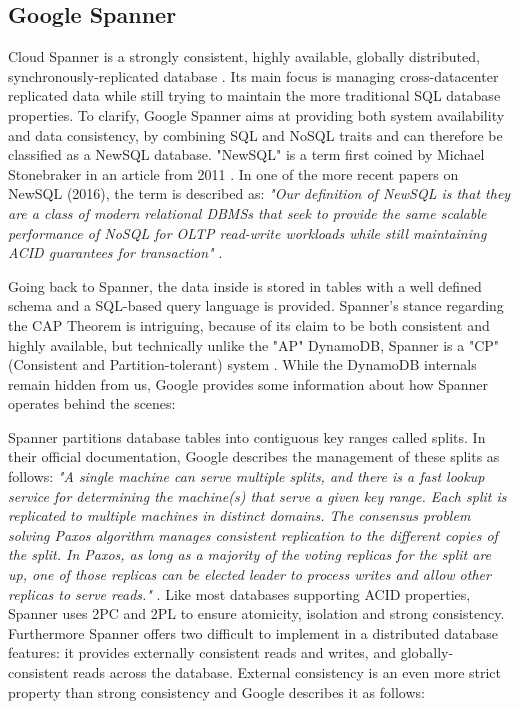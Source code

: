 \documentclass[letterpaper, 10 pt, conference]{ieeeconf}  %
\begin{document}
\subsection{Google Spanner}
Cloud Spanner is a strongly consistent, highly available, globally distributed, synchronously-replicated database \cite{SpannerWebPage}. Its main focus is managing cross-datacenter replicated data while still trying to maintain the more traditional SQL database properties. To clarify, Google Spanner aims at providing both system availability and data consistency, by combining SQL and NoSQL traits and can therefore be classified as a NewSQL database. "NewSQL" is a term first coined by Michael Stonebraker in an article from 2011 \cite{newsql}. In one of the more recent papers on NewSQL (2016), the term is described as:
\textit{"Our definition of NewSQL is that they are a class of modern relational DBMSs that seek to provide the same scalable performance of NoSQL for OLTP read-write workloads while still maintaining ACID guarantees for transaction"} \cite{Pavlo:2016:WRN:3003665.3003674}. \par
Going back to Spanner, the data inside is stored in tables with a well defined schema and a SQL-based query language is provided. Spanner's stance regarding the CAP Theorem is intriguing, because of its claim to be both consistent and highly available, but technically unlike the "AP" DynamoDB, Spanner is a "CP"(Consistent and Partition-tolerant) system \cite{SpannerWebPage}. While the DynamoDB internals remain hidden from us, Google provides some information about how Spanner operates behind the scenes: \par
Spanner partitions database tables into contiguous key ranges called splits. In their official documentation, Google describes the management of these splits as follows:
\textit{"A single machine can serve multiple splits, and there is a fast lookup service for determining the machine(s) that serve a given key range. Each split is replicated to multiple machines in distinct domains. The consensus problem solving Paxos algorithm manages consistent replication to the different copies of the split. In Paxos, as long as a majority of the voting replicas for the split are up, one of those replicas can be elected leader to process writes and allow other replicas to serve reads."} \cite{SpannerWebPage}.
Like most databases supporting ACID properties, Spanner uses 2PC and 2PL to ensure atomicity, isolation and strong consistency. Furthermore Spanner offers two difficult to implement in a distributed database features: it provides externally consistent reads and writes, and globally-consistent reads across the database. External consistency is an even more strict property than strong consistency and Google describes it as follows:
\end{document}

